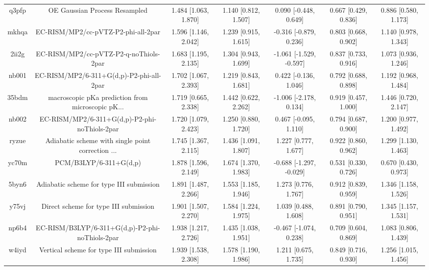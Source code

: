 \documentclass{article}
\begin{document}
\begin{center}
\begin{longtable}{|ccccccc|}
 q3pfp &                      OE Gaussian Process Resampled &  1.484 [1.063, 1.870] &  1.140 [0.812, 1.507] &    0.090 [-0.448, 0.649] &  0.667 [0.429, 0.836] &   0.886 [0.580, 1.173] \\
 mkhqa &                EC-RISM/MP2/cc-pVTZ-P2-phi-all-2par &  1.596 [1.146, 2.042] &  1.239 [0.915, 1.615] &   -0.316 [-0.879, 0.236] &  0.803 [0.668, 0.902] &   1.140 [0.978, 1.343] \\
 2ii2g &             EC-RISM/MP2/cc-pVTZ-P2-q-noThiols-2par &  1.683 [1.195, 2.135] &  1.304 [0.943, 1.699] &  -1.061 [-1.529, -0.597] &  0.837 [0.733, 0.916] &   1.073 [0.936, 1.246] \\
 nb001 &           EC-RISM/MP2/6-311+G(d,p)-P2-phi-all-2par &  1.702 [1.067, 2.393] &  1.219 [0.843, 1.681] &    0.422 [-0.136, 1.046] &  0.792 [0.688, 0.898] &   1.192 [0.968, 1.484] \\
 35bdm &  macroscopic pKa prediction from microscopic pK... &  1.719 [0.665, 2.338] &  1.442 [0.622, 2.262] &   -1.006 [-2.178, 0.134] &  0.919 [0.457, 1.000] &   1.446 [0.720, 2.147] \\
 nb002 &      EC-RISM/MP2/6-311+G(d,p)-P2-phi-noThiols-2par &  1.720 [1.079, 2.423] &  1.250 [0.880, 1.720] &    0.467 [-0.095, 1.110] &  0.794 [0.687, 0.900] &   1.200 [0.977, 1.492] \\
 ryzue &  Adiabatic scheme with single point correction ... &  1.745 [1.367, 2.115] &  1.436 [1.091, 1.807] &     1.227 [0.777, 1.677] &  0.922 [0.860, 0.962] &   1.299 [1.130, 1.463] \\
 yc70m &                             PCM/B3LYP/6-311+G(d,p) &  1.878 [1.596, 2.149] &  1.674 [1.370, 1.983] &  -0.688 [-1.297, -0.029] &  0.531 [0.330, 0.726] &   0.670 [0.430, 0.973] \\
 5byn6 &           Adiabatic scheme for type III submission &  1.891 [1.487, 2.266] &  1.553 [1.185, 1.946] &     1.273 [0.776, 1.767] &  0.912 [0.839, 0.959] &   1.346 [1.158, 1.526] \\
 y75vj &              Direct scheme for type III submission &  1.901 [1.507, 2.270] &  1.584 [1.224, 1.975] &     1.039 [0.488, 1.608] &  0.891 [0.790, 0.951] &   1.345 [1.157, 1.531] \\
 np6b4 &    EC-RISM/B3LYP/6-311+G(d,p)-P2-phi-noThiols-2par &  1.938 [1.217, 2.726] &  1.435 [1.038, 1.951] &   -0.467 [-1.074, 0.238] &  0.709 [0.604, 0.869] &   1.083 [0.806, 1.439] \\
 w4iyd &            Vertical scheme for type III submission &  1.939 [1.538, 2.308] &  1.578 [1.190, 1.986] &     1.211 [0.675, 1.735] &  0.849 [0.716, 0.930] &   1.256 [1.015, 1.456] \\

\end{longtable}
\end{center}
\end{document}
